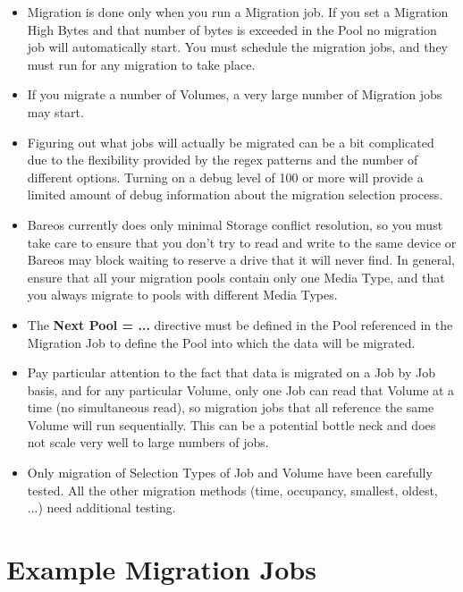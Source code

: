 \begin{itemize}
\item Migration is done only when you run a Migration job. If you set a
      Migration High Bytes and that number of bytes is exceeded in the Pool
      no migration job will automatically start.  You must schedule the
      migration jobs, and they must run for any migration to take place.

\item If you migrate a number of Volumes, a very large number of Migration
      jobs may start.

\item Figuring out what jobs will actually be migrated can be a bit complicated
      due to the flexibility provided by the regex patterns and the number of
      different options.  Turning on a debug level of 100 or more will provide
      a limited amount of debug information about the migration selection
      process.

\item Bareos currently does only minimal Storage conflict resolution, so you
      must take care to ensure that you don't try to read and write to the
      same device or Bareos may block waiting to reserve a drive that it
      will never find. In general, ensure that all your migration
      pools contain only one Media Type, and that you always
      migrate to pools with different Media Types.

\item The {\bf Next Pool = ...} directive must be defined in the Pool
     referenced in the Migration Job to define the Pool into which the
     data will be migrated.

\item Pay particular attention to the fact that data is migrated on a Job
     by Job basis, and for any particular Volume, only one Job can read
     that Volume at a time (no simultaneous read), so migration jobs that
     all reference the same Volume will run sequentially.  This can be a
     potential bottle neck and does not scale very well to large numbers
     of jobs.

\item Only migration of Selection Types of Job and Volume have
     been carefully tested. All the other migration methods (time,
     occupancy, smallest, oldest, ...) need additional testing.
\end{itemize}


\section{Example Migration Jobs}

